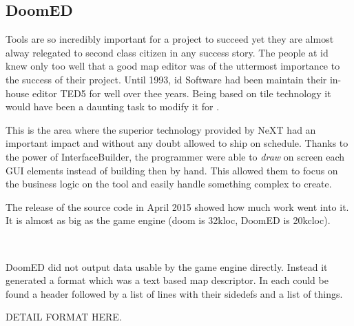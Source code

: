 \subsection{DoomED}
Tools are so incredibly important for a project to succeed yet they are almost alway relegated to second class citizen in any success story. The people at id knew only too well that a good map editor was of the uttermost importance to the success of their project. Until 1993, id Software had been maintain their in-house editor TED5 for well over thee years. Being based on tile technology it would have been a daunting task to modify it for \doom.\\
\par
This is the area where the superior technology provided by NeXT had an important impact and without any doubt allowed \doom to ship on schedule. Thanks to the power of InterfaceBuilder, the programmer were able to \textit{draw} on screen each GUI elements instead of building then by hand. This allowed them to focus on the business logic on the tool and easily handle something complex to create.\\
\par
{}
\par

The release of the source code in April 2015 showed how much work went into it. It is almost as big as the game engine (doom is 32kloc, DoomED is 20kcloc).\\
\par
{}
\par
{}\\
\par
{}
\par


DoomED did not output data usable by the game engine directly. Instead it generated a  format which was a text based map descriptor. In each  could be found a header followed by a list of lines with their sidedefs and a list of things.\\
\par
{}
\par
DETAIL FORMAT HERE.
\par
{}
\par

\pagebreak





